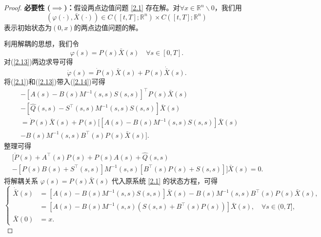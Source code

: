 \documentclass{GZUbachelorthesis}
\begin{document}
\begin{proof}
	\textbf{必要性 ($\implies$)：}假设两点边值问题 \eqref{2.1} 存在解。对${\forall x\in\mathbb{R}^n\backslash0}$，我们用
	\begin{equation*}
		{(\varphi(\cdot),\bar{X}(\cdot))\in C([t,T];\mathbb{R}^n)\times C([t,T];\mathbb{R}^n)}
	\end{equation*}
	表示初始状态为${(0,x)}$的两点边值问题的解。\par
	利用解耦的思想，我们令
	\begin{equation}\label{2.13}
		\varphi(s)=P(s)\bar{X}(s)\quad\forall s\in[0,T].
	\end{equation}
	对(\ref{2.13})两边求导可得
	\begin{equation}\label{2.14}
		\dot{\varphi}(s)=\dot{P}(s)\bar{X}(s)+P(s)\dot{\bar{X}}(s).
	\end{equation}
	将(\ref{2.1})和(\ref{2.13})带入(\ref{2.14})可得
	\begin{equation}\label{2.15}
		\begin{aligned}
			&-\left[A(s)-B(s)M^{-1}(s,s)S(s,s)\right]^\top P(s)\bar{X}(s)\\ &-\left[\hat{Q}(s,s)-S^\top(s,s)M^{-1}(s,s)S(s,s)\right]\bar{X}(s)\\
			&=\dot{P}(s)\bar{X}(s)+P(s)\bigg[\left[A(s)-B(s)M^{-1}(s,s)S(s,s)\right]\bar{X}(s) \\
			& -B(s)M^{-1}(s,s)B^\top(s)P(s)\bar{X}(s)\bigg].
		\end{aligned}
	\end{equation}
	整理可得
	\begin{equation}\label{2.35}
		\begin{aligned}
			&\Big[\dot{P}(s)+A^\top(s)P(s)+P(s)A(s)+\hat{Q}(s,s)\\
			&-\left[P(s)B(s)+S^\top(s,s)\right]M^{-1}(s,s)[B^\top(s)P(s)+S(s,s)]\Big]\bar{X}(s) = 0.
		\end{aligned}
	\end{equation}
	将解耦关系 ${\varphi(s)=P(s)\bar{X}(s)}$ 代入原系统 \eqref{2.1} 的状态方程，可得
	\begin{equation}\label{2.17}
		\left\{
		\begin{aligned}
			\dot{\bar{X}}(s) &= \left[A(s)-B(s)M^{-1}(s,s)S(s,s)\right]\bar{X}(s) - B(s)M^{-1}(s,s)B^\top(s)P(s)\bar{X}(s), \\
			&= \left[A(s)-B(s)M^{-1}(s,s)\left(S(s,s)+B^\top(s)P(s)\right)\right]\bar{X}(s), \quad \forall s\in(0,T], \\
			\bar{X}(0) &= x.
		\end{aligned}

\end{equation}
\end{proof}
\end{document}

